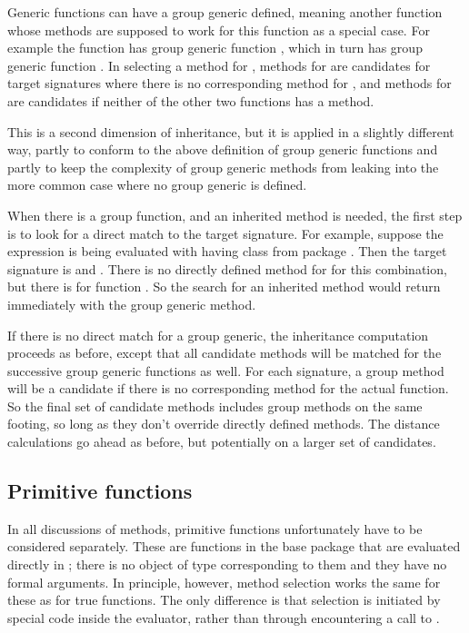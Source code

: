 \documentclass[11pt]{article}
\begin{document}
Generic functions can have a group generic defined, meaning another function whose methods are supposed to work for this function as a special case.
For example the function \SOperator{+} has group generic function , which in turn has group generic function .
In selecting a method for \SOperator{+}, methods for  are candidates for target signatures where there is no corresponding method for \SOperator{+}, and methods for  are candidates if neither of the other two functions has a method.

This is a second dimension of inheritance, but it is applied in a slightly different way, partly to conform to the above definition of group generic functions and partly to keep the complexity of group generic methods from leaking into the more common case where no group generic is defined.

When there is a group function, and an inherited method is needed, the first step is to look for a direct match to the target signature.
For example, suppose the expression  is being evaluated with  having class  from package .
Then the target signature is  and .
There is no directly defined method for \SOperator{+} for this combination, but there is for function .
So the search for an inherited method would return immediately with the group generic method.

If there is no direct match for a group generic, the inheritance computation proceeds as before, except that all candidate methods will be matched for the successive group generic functions as well.
For each signature, a group method will be a candidate if there is no corresponding method for the actual function.
So the final set of candidate methods includes group methods on the same footing, so long as they don't override directly defined methods.
The distance calculations go ahead as before, but potentially on a larger set of candidates.

\subsection*{Primitive functions}
\label{sec:primitive-functions}

In all discussions of methods, primitive functions unfortunately have to be considered separately.
These are functions in the base package that are evaluated directly in \C{}; there is no object of type  corresponding to them and they have no formal arguments.
In principle, however, method selection works the same for these as for true functions.
The only difference is that selection is initiated by special code inside the \R{} evaluator, rather than through encountering a call to .
\end{document}
